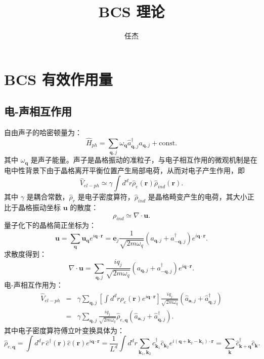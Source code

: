 \documentclass[10pt,UTF8]{ctexart}
\begin{document}
\title{BCS 理论}
\date{任杰}

\maketitle


\section*{BCS 有效作用量}
\subsection*{电-声相互作用}
\noindent 自由声子的哈密顿量为：
\begin{equation}
	\hat H_{ph} = \sum_{\bm q, j} \omega_{\bm q}\hat a^\dagger_{\bm q, j} a_{\bm q, j} + \mathrm{const}.
\end{equation}
其中 $\omega_{\bm q}$ 是声子能量。声子是晶格振动的准粒子，与电子相互作用的微观机制是在电中性背景下由于晶格离开平衡位置产生局部电荷，从而对电子产生作用，即
\begin{equation}
	\hat V_{el-ph} \simeq \gamma \int d^d r \hat\rho_e(\bm r) \hat\rho_{ind}(\bm r).
\end{equation}
其中 $\gamma$ 是耦合常数，$\hat\rho_r$ 是电子密度算符，$\hat \rho_{ind}$ 是晶格畸变产生的电荷，其大小正比于晶格振动坐标 $\bm u$ 的散度：
\begin{equation}
	\rho_{ind} \simeq \nabla \cdot \bm u.
\end{equation}
量子化下的晶格简正坐标为：
\begin{equation}
	\bm u 
	= \sum_{\bm q} \bm u_{\bm q} e^{i\bm q \cdot \bm r}
	=\bm e_j \frac{1}{\sqrt{2m\omega_q}} (a_{\bm q,j}+a_{-\bm q,j}^\dagger) e^{i\bm q \cdot \bm r}.
\end{equation}
求散度得到：
\begin{equation}
	\nabla \cdot \bm u  
	= \sum_{\bm q,j} \frac{iq_j}{\sqrt{2m\omega_q}} (a_{\bm q,j}+a_{-\bm q,j}^\dagger) e^{i \bm q \cdot \bm r}. 
\end{equation}
电-声相互作用为：
\begin{eqnarray}
	\hat V_{el-ph} 
	&=& \gamma \sum_{\bm q,j} \left[ \int d^d r \hat \rho_e(\bm r) e^{i\bm q\cdot \bm r} \right] \frac{iq_j}{\sqrt{2m\omega_q}} \left( \hat a_{\bm a,j}+\hat a^\dagger_{\bm q,j} \right) \nonumber \\
	&=& \gamma \sum_{\bm q,j} \frac{iq_j}{\sqrt{2m\omega_q}} \hat \rho_{e,\bm q} \left( \hat a_{\bm a,j}+\hat a^\dagger_{\bm q,j} \right).
\end{eqnarray}
其中电子密度算符傅立叶变换具体为：
\begin{equation}
	\hat \rho_{e,\bm q} 
	= \int d^d r \ \hat c^\dagger(\bm r) \hat c(\bm r)e^{i \bm q \cdot \bm r}
	= \frac{1}{L^d} \int d^d r \sum_{\bm k_1, \bm k_2} \hat c^\dagger_{\bm k_1} \hat c_{\bm k_2} e^{i (\bm q + \bm k_2 - \bm k_1)\cdot \bm r}
	= \sum_{\bm k} \hat c^\dagger_{\bm k+\bm q} \hat c_{\bm k}.
\end{equation}
\end{document}
